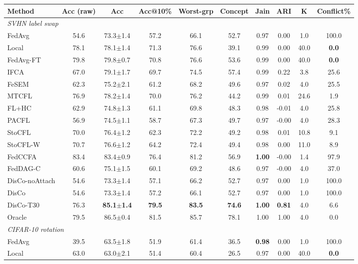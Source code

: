 \scriptsize
\setlength{\tabcolsep}{3.2pt}
\begin{tabular}{lccccccccc}
\toprule
Method & Acc (raw) & Acc & Acc@10\% & Worst-grp & Concept & Jain & ARI & K & Conflict\% \\
\midrule
\multicolumn{10}{l}{\textit{SVHN label swap}}\\
FedAvg & 54.6 & 73.3$\pm$1.4 & 57.2 & 66.1 & 52.7 & 0.97 & 0.00 & 1.0 & 100.0 \\
Local & 78.1 & 78.1$\pm$1.4 & 71.3 & 76.6 & 39.1 & 0.99 & 0.00 & 40.0 & \textbf{0.0} \\
FedAvg-FT & 79.8 & 79.8$\pm$0.7 & 70.8 & 76.6 & 53.6 & 0.99 & 0.00 & 40.0 & \textbf{0.0} \\
IFCA & 67.0 & 79.1$\pm$1.7 & 69.7 & 74.5 & 57.4 & 0.99 & 0.22 & 3.8 & 25.6 \\
FeSEM & 62.3 & 75.2$\pm$2.1 & 61.2 & 68.2 & 49.6 & 0.97 & 0.02 & 4.0 & 25.5 \\
MTCFL & 76.9 & 78.2$\pm$1.4 & 70.0 & 76.2 & 44.2 & 0.99 & 0.01 & 24.6 & 1.9 \\
FL+HC & 62.9 & 74.8$\pm$1.3 & 61.1 & 69.8 & 48.3 & 0.98 & -0.01 & 4.0 & 25.8 \\
PACFL & 56.9 & 74.5$\pm$1.1 & 58.7 & 67.3 & 49.7 & 0.97 & -0.00 & 4.0 & 28.3 \\
StoCFL & 70.0 & 76.4$\pm$1.2 & 62.3 & 72.2 & 49.2 & 0.98 & 0.01 & 10.8 & 9.1 \\
StoCFL-W & 70.7 & 76.6$\pm$1.2 & 64.2 & 72.4 & 49.4 & 0.98 & 0.00 & 11.0 & 8.9 \\
FedCCFA & 83.4 & 83.4$\pm$0.9 & 76.4 & 81.2 & 56.9 & \textbf{1.00} & -0.00 & 1.4 & 97.9 \\
FedDAG-C & 60.6 & 75.1$\pm$1.5 & 60.1 & 69.2 & 48.6 & 0.97 & -0.00 & 4.0 & 37.0 \\
DisCo-noAttach & 54.6 & 73.3$\pm$1.4 & 57.1 & 66.2 & 52.7 & 0.97 & 0.00 & 1.0 & 100.0 \\
DisCo & 54.6 & 73.3$\pm$1.4 & 57.2 & 66.1 & 52.7 & 0.97 & 0.00 & 1.0 & 100.0 \\
DisCo-T30 & 76.3 & \textbf{85.1$\pm$1.4} & \textbf{79.5} & \textbf{83.5} & \textbf{74.6} & \textbf{1.00} & \textbf{0.81} & 4.0 & 6.6 \\
Oracle & 79.5 & 86.5$\pm$0.4 & 81.5 & 85.7 & 78.1 & 1.00 & 1.00 & 4.0 & 0.0 \\
\midrule
\multicolumn{10}{l}{\textit{CIFAR-10 rotation}}\\
FedAvg & 39.5 & 63.5$\pm$1.8 & 51.9 & 61.4 & 36.5 & \textbf{0.98} & 0.00 & 1.0 & 100.0 \\
Local & 63.0 & 63.0$\pm$2.1 & 51.4 & 60.4 & 26.5 & 0.97 & 0.00 & 40.0 & \textbf{0.0} \\

\end{tabular}
